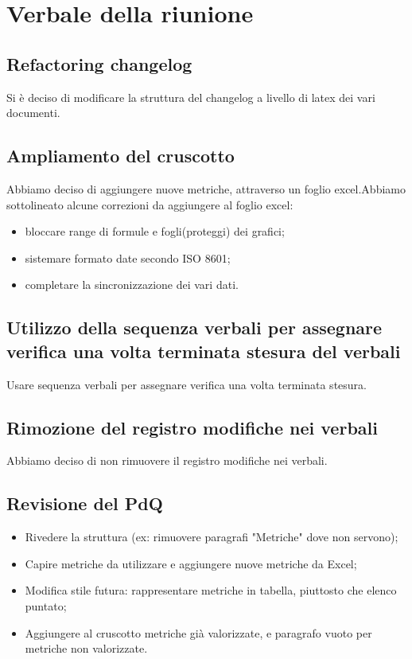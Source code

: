 \section{Verbale della riunione}
\subsection{Refactoring changelog}
Si è deciso di modificare la struttura del changelog a livello di latex dei vari documenti.

\subsection{Ampliamento del cruscotto}
Abbiamo deciso di aggiungere nuove metriche, attraverso un foglio excel.Abbiamo sottolineato alcune correzioni da aggiungere al foglio excel:
\begin{itemize}
	\item bloccare range di formule e fogli(proteggi) dei grafici;
	\item sistemare formato date secondo ISO 8601;
	\item completare la sincronizzazione dei vari dati.
\end{itemize}

\subsection{Utilizzo della sequenza verbali per assegnare verifica una volta terminata stesura del verbali}
Usare sequenza verbali per assegnare verifica una volta terminata stesura.

\subsection{Rimozione del registro modifiche nei verbali}
Abbiamo deciso di non rimuovere il registro modifiche nei verbali.

\subsection{Revisione del PdQ}
\begin{itemize}	
	\item Rivedere la struttura (ex: rimuovere paragrafi "Metriche" dove non servono);
	\item Capire metriche da utilizzare e aggiungere nuove metriche da Excel;
	\item Modifica stile futura: rappresentare metriche in tabella, piuttosto che elenco puntato;
	\item Aggiungere al cruscotto metriche già valorizzate, e paragrafo vuoto per metriche non valorizzate.
\end{itemize}

